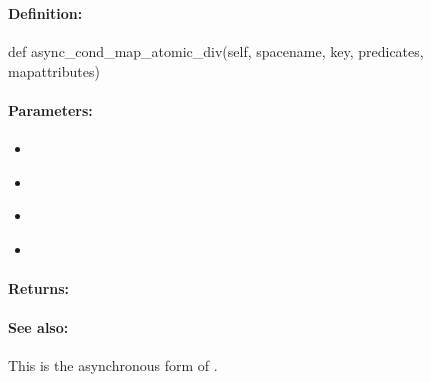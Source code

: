 \pagebreak
\subsubsection{}
\label{api:python:async_cond_map_atomic_div}


\paragraph{Definition:}
\begin{pythoncode}
def async_cond_map_atomic_div(self, spacename, key, predicates, mapattributes)
\end{pythoncode}

\paragraph{Parameters:}
\begin{itemize}[noitemsep]
\item {}\\

\item {}\\

\item {}\\

\item {}\\

\end{itemize}

\paragraph{Returns:}


\paragraph{See also:}  This is the asynchronous form of .

\pagebreak
\subsubsection{}
\label{api:python:group_map_atomic_div}


